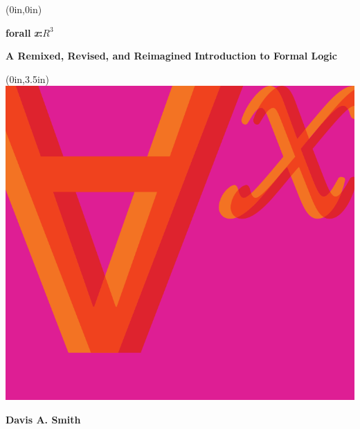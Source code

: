 \documentclass[openany,oneside,14pt]{memoir}
\begin{document}
\midsloppy

\thispagestyle{empty}
\pagecolor{lyallpink}\afterpage{\nopagecolor}

\begin{textblock*}{0in}(0in,0in)
  \noindent\hfill
  \begin{minipage}[b][\stockheight][s]{.95\stockwidth}
    \begin{center}
      \vspace*{1.5cm}
      \sffamily\fontsize{66pt}{0pt}\selectfont
      \color{white}
      \textbf{forall}%
      \fontsize{66pt}{0pt}\selectfont\rmfamily\textbf{\textit{x}:$R^3$}%
     \end{center}
     \begin{center}
       \vskip0.5cm             
      \color{white}
      \sffamily
      \fontsize{20pt}{22pt}\selectfont
      \textbf{A Remixed, Revised, and Reimagined} 
      \vskip0.5cm
      \textbf{Introduction to Formal Logic}
	\end{center}
	\begin{textblock*}{\stockwidth}(0in,3.5in)
  \noindent\includegraphics[width=8.5in]{assets/forallx-coverart-screen.pdf}
\end{textblock*}
\begin{raggedleft}
      \vfill
      \fontsize{11pt}{14pt}\selectfont
      \color{white}
     \textbf{Davis A. Smith}\\

\end{raggedleft}
\end{minipage}
\end{textblock*}
\end{document}
